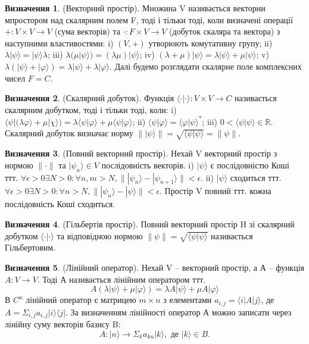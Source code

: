 \documentclass{article}
\theoremstyle{definition}
\newtheorem{definition}{Визначення}
\begin{document}
\begin{definition} (Векторний простір). Множина V називається векторни мпростором над
скалярним полем F, тоді і тільки тоді, коли визначені операції $+ :V \times V \rightarrow V$ (сума векторів)
та $\cdot:F\times V\rightarrow V$ (добуток скаляра та вектора) з наступними властивостями:
i) $(V,+)$ утворюють комутативну групу;
ii) $\lambda |\psi\rangle = |\psi\rangle \lambda$;
iii) $\lambda(\mu|\psi\rangle) = (\lambda\mu)|\psi\rangle$;
iv) $(\lambda+\mu)|\psi\rangle = \lambda|\psi\rangle + \mu|\psi\rangle$;
v) $\lambda(|\psi\rangle+|\varphi\rangle) = \lambda|\psi\rangle + \lambda|\varphi\rangle$.
Далі будемо розглядати скалярне поле комплексних чисел $F=C$.
\end{definition}

\begin{definition} (Скалярний добуток).
Функція $\langle\cdot|\cdot\rangle:V\times V\rightarrow C$ називається скалярним
добутком, тоді і тільки тоді, коли:
i) $\langle\psi|(\lambda\varphi\rangle+\mu|\chi\rangle) = \lambda\langle\psi|\varphi\rangle+\mu\langle\psi|\varphi\rangle$;
ii) $\langle\psi|\varphi\rangle = \langle\varphi|\psi\rangle^*$;
iii) $0 < \langle\psi|\psi\rangle \in \mathbb{R}$.
Скалярний добуток визначає норму
$\parallel|\psi\rangle\parallel = \sqrt{\langle\psi|\psi\rangle} = \parallel\psi\parallel$.
\end{definition}

\begin{definition} (Повний векторний простір).
Нехай V векторний простір з нормою $\parallel\cdot\parallel$ та $|\psi_n\rangle \in V$
послідовність векторів.
i) $|\psi\rangle$ є послідовністю Коші ттт. $\forall\epsilon>0\exists N>0 : \forall n,m> N, \parallel |\psi_n\rangle - |\psi_{n+1}\rangle\parallel < \epsilon$.
ii) $|\psi\rangle$ сходиться ттт. $\forall\epsilon>0\exists N>0 : \forall n> N, \parallel |\psi_n\rangle - |\psi\rangle\parallel < \epsilon$.
Простір V повний ттт. кожна послідовність Коші сходиться.
\end{definition}

\begin{definition} (Гільбертів простір).
Повний векторний простір H зі скалярний добутком $\langle\cdot|\cdot\rangle$ та
відповідною нормою $\parallel\psi\parallel=\sqrt{\langle\psi|\psi\rangle}$ називається Гільбертовим.
\end{definition}

\begin{definition} (Лінійний оператор).
Нехай V -- векторний простір, а А -- функція $A : V \rightarrow V$. Тоді А
називається лінійним оператором ттт.
$$
A(\lambda|\psi\rangle + \mu|\varphi\rangle) = \lambda A |\psi\rangle + \mu A |\varphi\rangle
$$
В $C^n$ лінійний оператор є матрицею $m \times n$
з елементами $a_{i,j} = \langle i | A | j \rangle$, де $A = \Sigma_{i,j} a_{i,j} | i\rangle\langle j|$.
За визначенням лінійності оператор А можно записати через лінійну суму векторів базису B:
$$
A : |n\rangle \rightarrow \Sigma_k a_{kn}|k\rangle, \text{\ де\ } |k\rangle \in B.
$$
\end{definition}
\end{document}
